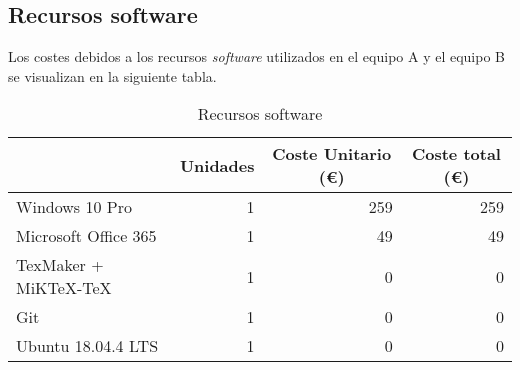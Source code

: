 \subsection{Recursos software}
\label{subsec:recursos-software}

Los costes debidos a los recursos \textit{software} utilizados en el equipo A y el equipo B se visualizan en la siguiente tabla.

\vspace{0.5cm}

\begin{table}[ht]
\centering
\caption{Recursos software}
\label{tab:recursos-software}
\begin{tabular}{lrrr}
\hline
\rowcolor[HTML]{EFEFEF} 
\multicolumn{1}{|c|}{\cellcolor[HTML]{EFEFEF}\textbf{Concepto}} & \multicolumn{1}{c|}{\cellcolor[HTML]{EFEFEF}\textbf{Unidades}} & \multicolumn{1}{c|}{\cellcolor[HTML]{EFEFEF}\textbf{Coste Unitario (\euro)}} & \multicolumn{1}{c|}{\cellcolor[HTML]{EFEFEF}\textbf{Coste total (\euro)}} \\ \hline
\multicolumn{1}{|l|}{Windows 10 Pro}                            & \multicolumn{1}{r|}{1}                                         & \multicolumn{1}{r|}{259}                                               & \multicolumn{1}{r|}{259}                                            \\ \hline
\multicolumn{1}{|l|}{Microsoft Office 365}                      & \multicolumn{1}{r|}{1}                                         & \multicolumn{1}{r|}{49}                                                & \multicolumn{1}{r|}{49}                                             \\ \hline
\multicolumn{1}{|l|}{TexMaker + MiKTeX-TeX}                     & \multicolumn{1}{r|}{1}                                         & \multicolumn{1}{r|}{0}                                                 & \multicolumn{1}{r|}{0}                                              \\ \hline
\multicolumn{1}{|l|}{Git}                                       & \multicolumn{1}{r|}{1}                                         & \multicolumn{1}{r|}{0}                                                 & \multicolumn{1}{r|}{0}                                              \\ \hline
\multicolumn{1}{|l|}{Ubuntu 18.04.4 LTS}                        & \multicolumn{1}{r|}{1}                                         & \multicolumn{1}{r|}{0}                                                 & \multicolumn{1}{r|}{0}                                              \\ \hline

\end{tabular}
\end{table}
